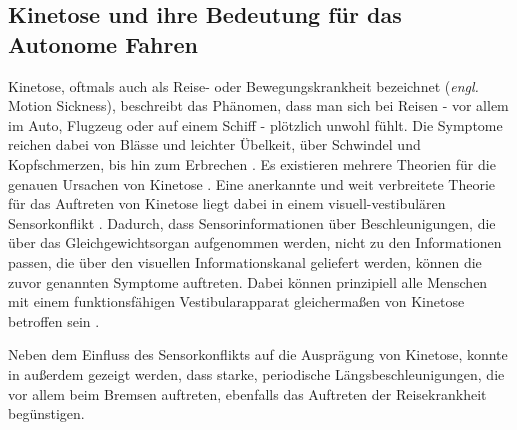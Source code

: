 \subsection{Kinetose und ihre Bedeutung für das Autonome Fahren}\label{sec:kinetose}
Kinetose, oftmals auch als Reise- oder Bewegungskrankheit bezeichnet (\textit{engl.} Motion Sickness), beschreibt das Phänomen, dass man sich bei Reisen - vor allem im Auto, Flugzeug oder auf einem Schiff - plötzlich unwohl fühlt. Die Symptome reichen dabei von Blässe und leichter Übelkeit, über Schwindel und Kopfschmerzen, bis hin zum Erbrechen \cite{money}\cite{Money.1970}. Es existieren mehrere Theorien für die genauen Ursachen von Kinetose \cite{money}\cite{Money.1970}. Eine anerkannte und weit verbreitete Theorie für das Auftreten von Kinetose liegt dabei in einem visuell-vestibulären Sensorkonflikt \cite{motion sickness golding, motion sickness reason, motion sickness benson}\cite{Golding.2006}\Cite{Reason.1975}. Dadurch, dass Sensorinformationen über Beschleunigungen, die über das Gleichgewichtsorgan aufgenommen werden, nicht zu den Informationen passen, die über den visuellen Informationskanal geliefert werden, können die zuvor genannten Symptome auftreten. Dabei können prinzipiell alle Menschen mit einem funktionsfähigen Vestibularapparat gleichermaßen von Kinetose betroffen sein \cite{motion sickness lackner}\cite{Lackner.2014}. 

Neben dem Einfluss des Sensorkonflikts auf die Ausprägung von Kinetose, konnte in \cite{vogel motion sickness}\cite{Vogel.1982} außerdem gezeigt werden, dass starke, periodische Längsbeschleunigungen, die vor allem beim Bremsen auftreten, ebenfalls das Auftreten der Reisekrankheit begünstigen. 

